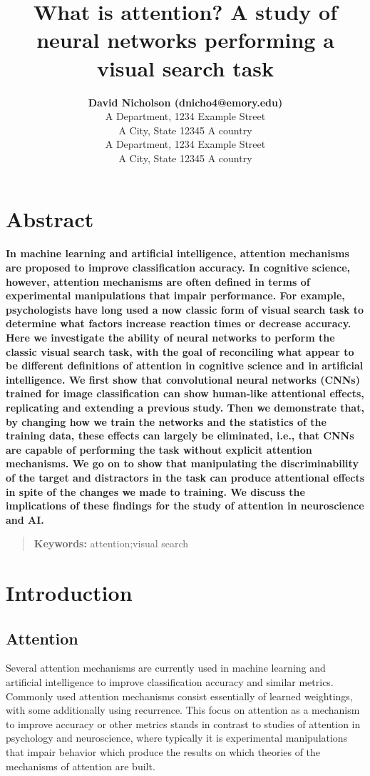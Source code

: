 \documentclass[10pt,letterpaper]{article}
\title{What is attention? A study of neural networks performing a visual search task}
\author{{\large \bf David Nicholson (dnicho4@emory.edu)} \\
  A Department, 1234 Example Street\\
A City, State 12345 A country
  \AND {\large \bf Astrid Prinz (AnotherPerson@this.planet.edu)} \\
  A Department, 1234 Example Street\\
A City, State 12345 A country}
\begin{document}
\maketitle


\section{Abstract}
{
\bf
In machine learning and artificial intelligence, attention mechanisms are proposed to improve classification accuracy. In cognitive science, however, attention mechanisms are often defined in terms of experimental manipulations that impair performance. For example, psychologists have long used a now classic form of visual search task to determine what factors increase reaction times or decrease accuracy. Here we investigate 
the ability of neural networks to perform the classic visual search task, with the goal of reconciling what appear to be different definitions of 
attention in cognitive science and in artificial intelligence. We first show that convolutional neural networks (CNNs) trained for image classification 
can show human-like attentional effects, replicating and extending a previous study. Then we demonstrate that, by changing how we train the networks 
and the statistics of the training data, these effects can largely be eliminated, i.e., that CNNs are capable of performing the task without explicit 
attention mechanisms. We go on to show that manipulating the discriminability of the target and distractors in the task can produce attentional effects 
in spite of the changes we made to training. We discuss the implications of these findings for the study of attention in neuroscience and AI.
}
\begin{quote}
\small
\textbf{Keywords:} 
attention;visual search
\end{quote}

\section{Introduction}
\subsection{Attention}
Several attention mechanisms are currently used in machine learning 
and artificial intelligence to improve classification accuracy and similar 
metrics. Commonly used attention mechanisms consist essentially of learned 
weightings, with some additionally using recurrence.
This focus on attention as a mechanism to improve accuracy or other metrics 
stands in contrast to studies of attention in psychology and neuroscience, 
where typically it is experimental manipulations that impair behavior which 
produce the results on which theories of the mechanisms of attention are built.
\end{document}
